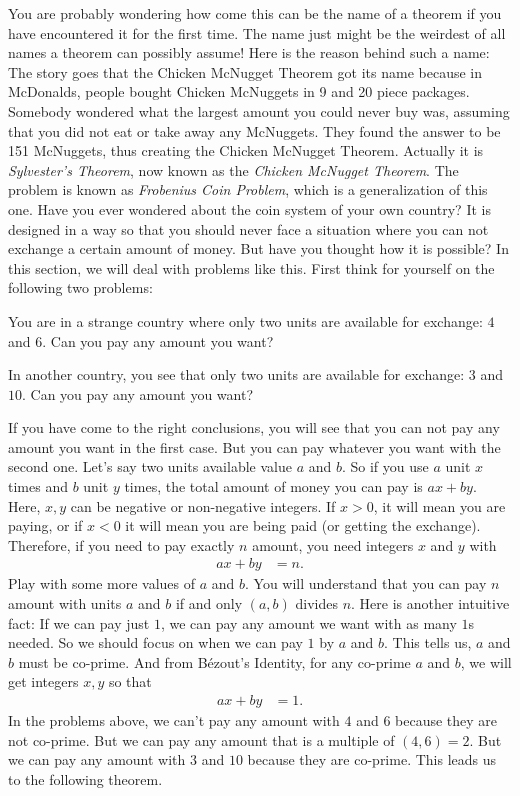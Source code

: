 \documentclass{subfile}
\begin{document}
	You are probably wondering how come this can be the name of a theorem if you have encountered it for the first time. The name just might be the weirdest of all names a theorem can possibly assume! Here is the reason behind such a name: The story goes that the Chicken McNugget Theorem got its name because in McDonalds, people bought Chicken McNuggets in 9 and 20 piece packages. Somebody wondered what the largest amount you could never buy was, assuming that you did not eat or take away any McNuggets. They found the answer to be 151 McNuggets, thus creating the Chicken McNugget Theorem. Actually it is \textit{Sylvester's Theorem}, now known as the \textit{Chicken McNugget Theorem}. The problem is known as \textit{Frobenius Coin Problem}, which is a generalization of this one. Have you ever wondered about the coin system of your own country? It is designed in a way so that you should never face a situation where you can not exchange a certain amount of money. But have you thought how it is possible? In this section, we will deal with problems like this. First think for yourself on the following two problems:
		\begin{problem}
			You are in a strange country where only two units are available for exchange: $4$ and $6$. Can you pay any amount you want?
		\end{problem}

		\begin{problem}
			In another country, you see that only two units are available for exchange: $3$ and $10$. Can you pay any amount you want?
		\end{problem}

	If you have come to the right conclusions, you will see that you can not pay any amount you want in the first case. But you can pay whatever you want with the second one. Let's say two units available value $a$ and $b$. So if you use $a$ unit $x$ times and $b$ unit $y$ times, the total amount of money you can pay is $ax+by$. Here, $x,y$ can be negative or non-negative integers. If $x>0$, it will mean you are paying, or if $x<0$ it will mean you are being paid (or getting the exchange). Therefore, if you need to pay exactly $n$ amount, you need integers $x$ and $y$ with
		\begin{align*}
			ax+by & = n.
		\end{align*}
	Play with some more values of $a$ and $b$. You will understand that you can pay $n$ amount with units $a$ and $b$ if and only $(a,b)$ divides $n$. Here is another intuitive fact: If we can pay just $1$, we can pay any amount we want with as many $1$s needed. So we should focus on when we can pay $1$ by $a$ and $b$. This tells us, $a$ and $b$ must be co-prime. And from B\'{e}zout's Identity, for any co-prime $a$ and $b$, we will get integers $x,y$ so that
		\begin{align*}
			ax+by & = 1.
		\end{align*}
	In the problems above, we can't pay any amount with $4$ and $6$ because they are not co-prime. But we can pay any amount that is a multiple of $(4,6)=2$. But we can pay any amount with $3$ and $10$ because they are co-prime. This leads us to the following theorem.
\end{document}
